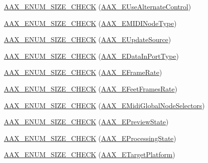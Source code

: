 \begin{DoxyCompactItemize}
\item 
\mbox{\hyperlink{a00491_a7becfade6ef2832f33559c576c0229b8}{A\+A\+X\+\_\+\+E\+N\+U\+M\+\_\+\+S\+I\+Z\+E\+\_\+\+C\+H\+E\+CK}} (\mbox{\hyperlink{a00491_abbcc8b4e8207262a5dd9e32047a51a29}{A\+A\+X\+\_\+\+E\+Use\+Alternate\+Control}})
\item 
\mbox{\hyperlink{a00491_a4846f0566f755423b00339b1d0c30286}{A\+A\+X\+\_\+\+E\+N\+U\+M\+\_\+\+S\+I\+Z\+E\+\_\+\+C\+H\+E\+CK}} (\mbox{\hyperlink{a00491_a5e1dffce35d05990dbbad651702678e4}{A\+A\+X\+\_\+\+E\+M\+I\+D\+I\+Node\+Type}})
\item 
\mbox{\hyperlink{a00491_aff578795a76f6d946b6f22297cf34122}{A\+A\+X\+\_\+\+E\+N\+U\+M\+\_\+\+S\+I\+Z\+E\+\_\+\+C\+H\+E\+CK}} (\mbox{\hyperlink{a00491_a30be0398faf20c6b121239eb9399f3f7}{A\+A\+X\+\_\+\+E\+Update\+Source}})
\item 
\mbox{\hyperlink{a00491_af6976d8f2262bc8a5c4764a400369c0b}{A\+A\+X\+\_\+\+E\+N\+U\+M\+\_\+\+S\+I\+Z\+E\+\_\+\+C\+H\+E\+CK}} (\mbox{\hyperlink{a00491_ab5677b173ad8647c24d34d28272d11fc}{A\+A\+X\+\_\+\+E\+Data\+In\+Port\+Type}})
\item 
\mbox{\hyperlink{a00491_aa81099aa0185ad9be2192c1a5b7e00ce}{A\+A\+X\+\_\+\+E\+N\+U\+M\+\_\+\+S\+I\+Z\+E\+\_\+\+C\+H\+E\+CK}} (\mbox{\hyperlink{a00491_a1271a51553bf508de59864334111aa8f}{A\+A\+X\+\_\+\+E\+Frame\+Rate}})
\item 
\mbox{\hyperlink{a00491_a91aa2cdae6c91defa1505e50e841859c}{A\+A\+X\+\_\+\+E\+N\+U\+M\+\_\+\+S\+I\+Z\+E\+\_\+\+C\+H\+E\+CK}} (\mbox{\hyperlink{a00491_a8a0c9dafef741a26ee8c06f7285a0dfa}{A\+A\+X\+\_\+\+E\+Feet\+Frames\+Rate}})
\item 
\mbox{\hyperlink{a00491_a41a000edf84a9a60ce852e7707deee96}{A\+A\+X\+\_\+\+E\+N\+U\+M\+\_\+\+S\+I\+Z\+E\+\_\+\+C\+H\+E\+CK}} (\mbox{\hyperlink{a00491_a349dae6bc64bda67a5440cbc6637f92d}{A\+A\+X\+\_\+\+E\+Midi\+Global\+Node\+Selectors}})
\item 
\mbox{\hyperlink{a00491_a4f26045654b3373a3ddd5e3323e4c2a0}{A\+A\+X\+\_\+\+E\+N\+U\+M\+\_\+\+S\+I\+Z\+E\+\_\+\+C\+H\+E\+CK}} (\mbox{\hyperlink{a00491_a12b280d7ccf22568759f8deb1fe1d6a8}{A\+A\+X\+\_\+\+E\+Preview\+State}})
\item 
\mbox{\hyperlink{a00491_abf9e76227a06a4e03facdc9740c663af}{A\+A\+X\+\_\+\+E\+N\+U\+M\+\_\+\+S\+I\+Z\+E\+\_\+\+C\+H\+E\+CK}} (\mbox{\hyperlink{a00491_a6ec854be40c8cf810dec97de3e56c0a7}{A\+A\+X\+\_\+\+E\+Processing\+State}})
\item 
\mbox{\hyperlink{a00491_a8e78dfa90ba7ea61b8260f8d919c8428}{A\+A\+X\+\_\+\+E\+N\+U\+M\+\_\+\+S\+I\+Z\+E\+\_\+\+C\+H\+E\+CK}} (\mbox{\hyperlink{a00491_a19e8cc27f59bb9bb4039b00fadb3cb83}{A\+A\+X\+\_\+\+E\+Target\+Platform}})

\end{DoxyCompactItemize}
